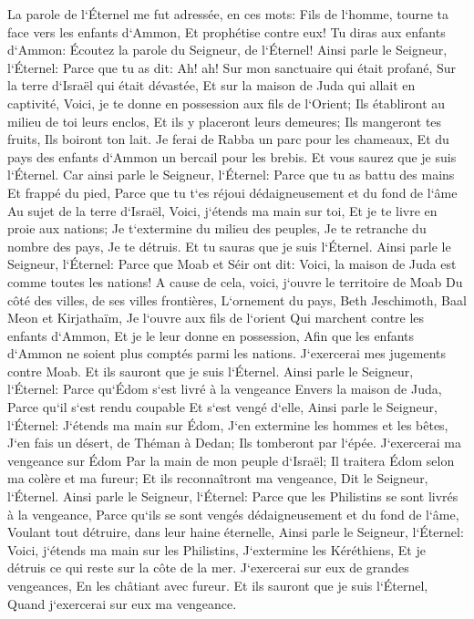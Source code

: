 \verse La parole de l`Éternel me fut adressée, en ces mots: 
\verse Fils de l`homme, tourne ta face vers les enfants d`Ammon, Et prophétise contre eux! 
\verse Tu diras aux enfants d`Ammon: Écoutez la parole du Seigneur, de l`Éternel! Ainsi parle le Seigneur, l`Éternel: Parce que tu as dit: Ah! ah! Sur mon sanctuaire qui était profané, Sur la terre d`Israël qui était dévastée, Et sur la maison de Juda qui allait en captivité, 
\verse Voici, je te donne en possession aux fils de l`Orient; Ils établiront au milieu de toi leurs enclos, Et ils y placeront leurs demeures; Ils mangeront tes fruits, Ils boiront ton lait. 
\verse Je ferai de Rabba un parc pour les chameaux, Et du pays des enfants d`Ammon un bercail pour les brebis. Et vous saurez que je suis l`Éternel. 
\verse Car ainsi parle le Seigneur, l`Éternel: Parce que tu as battu des mains Et frappé du pied, Parce que tu t`es réjoui dédaigneusement et du fond de l`âme Au sujet de la terre d`Israël, 
\verse Voici, j`étends ma main sur toi, Et je te livre en proie aux nations; Je t`extermine du milieu des peuples, Je te retranche du nombre des pays, Je te détruis. Et tu sauras que je suis l`Éternel. 
\verse Ainsi parle le Seigneur, l`Éternel: Parce que Moab et Séir ont dit: Voici, la maison de Juda est comme toutes les nations! 
\verse A cause de cela, voici, j`ouvre le territoire de Moab Du côté des villes, de ses villes frontières, L`ornement du pays, Beth Jeschimoth, Baal Meon et Kirjathaïm, 
\verse Je l`ouvre aux fils de l`orient Qui marchent contre les enfants d`Ammon, Et je le leur donne en possession, Afin que les enfants d`Ammon ne soient plus comptés parmi les nations. 
\verse J`exercerai mes jugements contre Moab. Et ils sauront que je suis l`Éternel. 
\verse Ainsi parle le Seigneur, l`Éternel: Parce qu`Édom s`est livré à la vengeance Envers la maison de Juda, Parce qu`il s`est rendu coupable Et s`est vengé d`elle, 
\verse Ainsi parle le Seigneur, l`Éternel: J`étends ma main sur Édom, J`en extermine les hommes et les bêtes, J`en fais un désert, de Théman à Dedan; Ils tomberont par l`épée. 
\verse J`exercerai ma vengeance sur Édom Par la main de mon peuple d`Israël; Il traitera Édom selon ma colère et ma fureur; Et ils reconnaîtront ma vengeance, Dit le Seigneur, l`Éternel. 
\verse Ainsi parle le Seigneur, l`Éternel: Parce que les Philistins se sont livrés à la vengeance, Parce qu`ils se sont vengés dédaigneusement et du fond de l`âme, Voulant tout détruire, dans leur haine éternelle, 
\verse Ainsi parle le Seigneur, l`Éternel: Voici, j`étends ma main sur les Philistins, J`extermine les Kéréthiens, Et je détruis ce qui reste sur la côte de la mer. 
\verse J`exercerai sur eux de grandes vengeances, En les châtiant avec fureur. Et ils sauront que je suis l`Éternel, Quand j`exercerai sur eux ma vengeance. 

